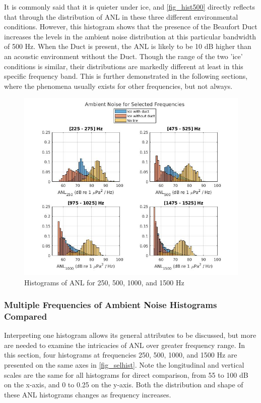 It is commonly said that it is quieter under ice, and \autoref{fig_hist500} directly reflects that through the distribution of ANL in these three different environmental conditions. However, this histogram shows that the presence of the Beaufort Duct increases the levels in the ambient noise distribution at this particular bandwidth of 500 Hz. When the Duct is present, the ANL is likely to be 10 dB higher than an acoustic environment without the Duct. Though the range of the two 'ice' conditions is similar, their distributions are markedly different at least in this specific frequency band. This is further demonstrated in the following sections, where the phenomena usually exists for other frequencies, but not always. %


\begin{figure}[h]
\centering
\includegraphics[scale=0.5]{Figures/selected_hists2.jpg}
\caption{Histograms of ANL for 250, 500, 1000, and 1500 Hz}
\label{fig_selhist}
\end{figure}

\subsubsection{Multiple Frequencies of Ambient Noise Histograms Compared}
Interpreting one histogram allows its general attributes to be discussed, but more are needed to examine the intricacies of ANL over greater frequency range. In this section, four histograms at frequencies 250, 500, 1000, and 1500 Hz are presented on the same axes in \autoref{fig_selhist}. Note the longitudinal and vertical scales are the same for all histograms for direct comparison, from 55 to 100 dB on the x-axis, and 0 to 0.25 on the y-axis. Both the distribution and shape of these ANL histograms changes as frequency increases. 


